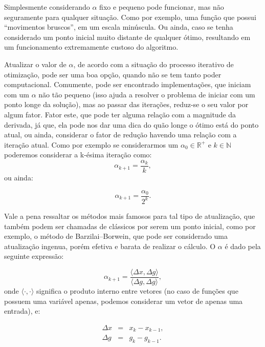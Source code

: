 Simplesmente considerando \(\alpha\) fixo e pequeno pode funcionar,
mas não seguramente para qualquer situação. Como por exemplo, uma função que
possui ``movimentos bruscos'', em um escala minúscula. Ou ainda, caso se tenha
considerado um ponto inicial muito distante de qualquer ótimo, resultando
em um funcionamento extremamente custoso do algoritmo.

Atualizar o valor de \(\alpha\), de acordo com a situação do processo iterativo
de otimização, pode ser uma boa opção, quando não se tem tanto poder
computacional. Comumente, pode ser encontrado implementações, que iniciam
com um \(\alpha\) não tão pequeno (isso ajuda a resolver o problema de
iniciar com um ponto longe da solução), mas ao passar das iterações,
reduz-se o seu valor por algum fator. Fator este, que pode ter alguma relação
com a magnitude da derivada, já que, ela pode nos dar uma dica do quão longe
o ótimo está do ponto atual, ou ainda, considerar o fator de redução havendo
uma relação com a iteração atual. Como por exemplo se considerarmos um
\(\alpha_0 \in \mathbb{R}^{+}\) e \(k \in \mathbb{N} \) poderemos considerar
a k-ésima iteração como:
\begin{equation}
    \alpha_{k+1} = \frac{\alpha_{k}}{k},
\end{equation}
ou ainda:

\begin{equation}
    \alpha_{k+1} = \frac{\alpha_{0}}{2^k}.
\end{equation}

Vale a pena ressaltar os métodos mais famosos para tal tipo de atualização,
que também podem ser chamadas de clássicos por serem um ponto inicial, como por
exemplo, o método de Barzilai–Borwein, que pode ser considerado uma atualização
ingenua, porém efetiva e barata de realizar o cálculo. O \(\alpha\) é dado
pela seguinte expressão:

\begin{equation}
    \alpha_{k+1} = \frac{\langle \Delta x, \Delta g \rangle}
        {\langle \Delta g, \Delta g \rangle},
\end{equation}
onde \( \langle \cdot, \cdot \rangle \) significa o produto interno entre
vetores (no caso de funções que possuem uma variável apenas, podemos
considerar um vetor de apenas uma entrada), e:

\begin{equation}
    \begin{array}{ccc}
        \Delta x& = &x_k - x_{k-1},\\
        \Delta g& = &g_k - g_{k-1}.
    \end{array}
\end{equation}



